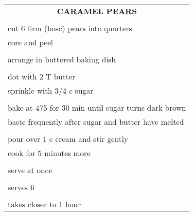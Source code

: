 \documentclass[8pt]{report}
\begin{document}
\begin{tabular}{|l|} \hline	%
 
\multicolumn{1}{|c|}{\textbf{CARAMEL PEARS}}
\\
\\

\index{desserts!caramel pears} \index{caramel pears}
\index{pear!caramel}

cut 6 firm (bosc) pears into quarters\\
core and peel\\
\\
arrange in buttered baking dish\\
\\
dot with 2 T butter\\
sprinkle with 3/4 c sugar\\
\\
bake at 475 for 30 min until sugar turns dark brown\\
baste frequently after sugar and butter have melted\\
\\
pour over 1 c cream and stir gently\\
cook for 5 minutes more\\
\\
serve at once\\
\\
serves 6\\
\\
takes closer to 1 hour\\

\hline

\end{tabular}

\newpage

\centering
\end{document}
